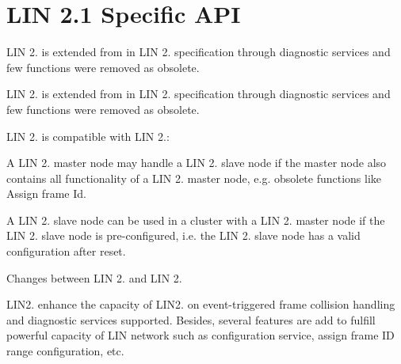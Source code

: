 \hypertarget{group___l_i_n21__core__api__group}{}\section{L\+I\+N 2.1 Specific A\+P\+I}
\label{group___l_i_n21__core__api__group}


L\+I\+N 2. is extended from in L\+I\+N 2. specification through diagnostic services and few functions were removed as obsolete.  


L\+I\+N 2. is extended from in L\+I\+N 2. specification through diagnostic services and few functions were removed as obsolete. 


\begin{DoxyEnumerate}
\item L\+I\+N 2. is compatible with L\+I\+N 2.\+:


\begin{DoxyItemize}
\item A L\+I\+N 2. master node may handle a L\+I\+N 2. slave node if the master node also contains all functionality of a L\+I\+N 2. master node, e.\+g. obsolete functions like Assign frame Id. 


\item A L\+I\+N 2. slave node can be used in a cluster with a L\+I\+N 2. master node if the L\+I\+N 2. slave node is pre-\/configured, i.\+e. the L\+I\+N 2. slave node has a valid configuration after reset. 
\end{DoxyItemize}


\item Changes between L\+I\+N 2. and L\+I\+N 2.

L\+I\+N2. enhance the capacity of L\+I\+N2. on event-\/triggered frame collision handling and diagnostic services supported. Besides, several features are add to fulfill powerful capacity of L\+I\+N network such as configuration service, assign frame I\+D range configuration, etc. 
\end{DoxyEnumerate}